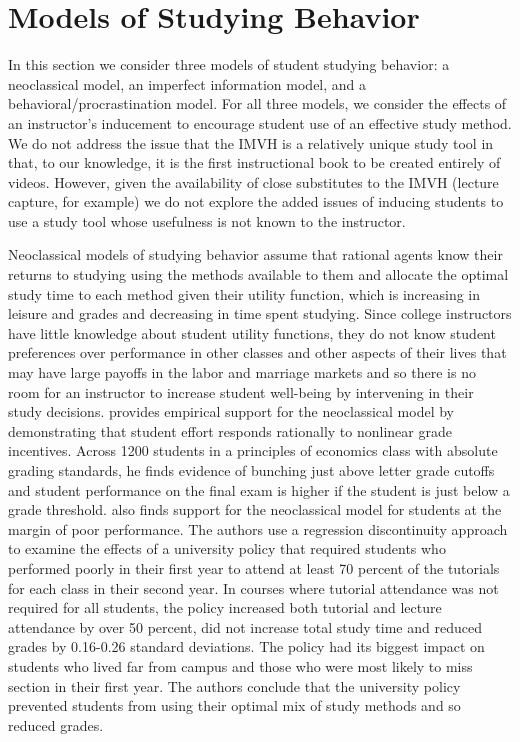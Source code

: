 \documentclass[12pt]{article}
\begin{document}
\section{Models of Studying Behavior}

In this section we consider three models of student studying behavior: a neoclassical model, an imperfect information model, and a behavioral/procrastination model. For all three models, we consider the effects of an instructor's inducement to encourage student use of an effective study method. We do not address the issue that the IMVH is a relatively unique study tool in that, to our knowledge, it is the first instructional book to be created entirely of videos. However, given the availability of close substitutes to the IMVH (lecture capture, for example) we do not explore the added issues of inducing students to use a study tool whose usefulness is not known to the instructor.

Neoclassical models of studying behavior assume that rational agents know their returns to studying using the methods available to them and allocate the optimal study time to each method given their utility function, which is increasing in leisure and grades and decreasing in time spent studying. Since college instructors have little knowledge about student utility functions, they do not know student preferences over performance in other classes and other aspects of their lives that may have large payoffs in the labor and marriage markets and so there is no room for an instructor to increase student well-being by intervening in their study decisions. \textcite{oettinger2002} provides empirical support for the neoclassical model by demonstrating that student effort responds rationally to nonlinear grade incentives. Across 1200 students in a principles of economics class with absolute grading standards, he finds evidence of bunching just above letter grade cutoffs and student performance on the final exam is higher if the student is just below a grade threshold.  \textcite{kow2020} also finds support for the neoclassical model for students at the margin of poor performance.  The authors use a regression discontinuity approach to examine the effects of a university policy that required students who performed poorly in their first year to attend at least 70 percent of the tutorials for each class in their second year.  In courses where tutorial attendance was not required for all students, the policy increased both tutorial and lecture attendance by over 50 percent, did not increase total study time and reduced grades by 0.16-0.26 standard deviations.  The policy had its biggest impact on students who lived far from campus and those who were most likely to miss section in their first year.  The authors conclude that the university policy prevented students from using their optimal mix of study methods and so reduced grades.
\end{document}
